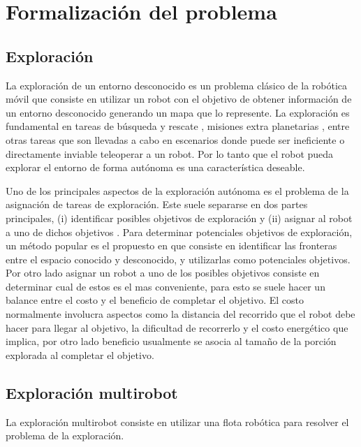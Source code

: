 \section{Formalización del problema}

\subsection{Exploración}
La exploración de un entorno desconocido es un problema clásico de la robótica móvil que consiste en utilizar un robot con el objetivo de obtener información de un entorno desconocido generando un mapa que lo represente. La exploración es fundamental en tareas de búsqueda y rescate \cite{Liu2015}, misiones extra planetarias \cite{schuster2019towards}, entre otras tareas que son llevadas a cabo en escenarios donde puede ser ineficiente o directamente inviable teleoperar a un robot. Por lo tanto que el robot pueda explorar el entorno de forma autónoma es una característica deseable.

Uno de los principales aspectos de la exploración autónoma es el problema de la asignación de tareas de exploración. Este suele separarse en dos partes principales, (i) identificar posibles objetivos de exploración y (ii) asignar al robot a uno de dichos objetivos \cite{amorin2019novel}. Para determinar potenciales objetivos de exploración, un método popular es el propuesto en \cite{yamauchi1998frontier} que consiste en identificar las fronteras entre el espacio conocido y desconocido, y utilizarlas como potenciales objetivos. Por otro lado asignar un robot a uno de los posibles objetivos consiste en determinar cual de estos es el mas conveniente, para esto se suele hacer un balance entre el costo y el beneficio de completar el objetivo. El costo normalmente involucra aspectos como la distancia del recorrido que el robot debe hacer para llegar al objetivo, la dificultad de recorrerlo y el costo energético que implica, por otro lado beneficio usualmente se asocia al tamaño de la porción explorada al completar el objetivo. 

\subsection{Exploración multirobot}\label{subsec:expmutirob}
La exploración multirobot consiste en utilizar una flota robótica para resolver el problema de la exploración.

